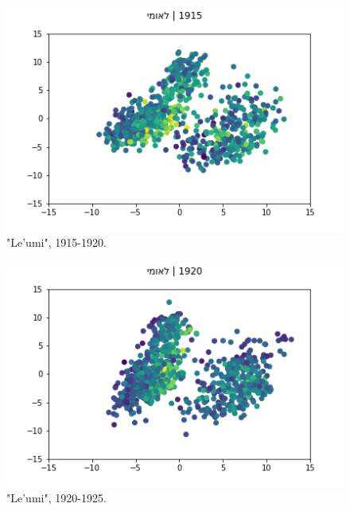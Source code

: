 \documentclass[10pt, a4paper]{article}
\begin{document}
\begin{figure}[!h]
\begin{center}
\includegraphics[scale=0.5]{LREC_PAPER/leumi_cwes/1915.png}
\caption{"Le'umi", 1915-1920.}
\label{Leumi2}
\end{center}
\end{figure}

\begin{figure}[!h]
\begin{center}
\includegraphics[scale=0.5]{LREC_PAPER/leumi_cwes/1920.png}
\caption{"Le'umi", 1920-1925.}
\label{Leumi3}
\end{center}
\end{figure}
\end{document}
